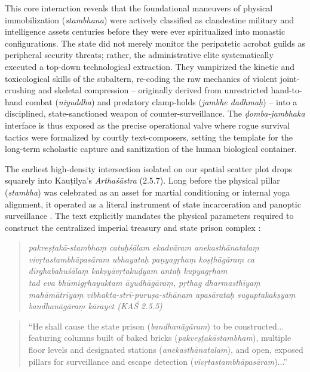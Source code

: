 \documentclass[11pt,twoside,letterpaper]{article}
\begin{document}
This core interaction reveals that the foundational maneuvers of physical immobilization (\textit{stambhana}) were actively classified as clandestine military and intelligence assets centuries before they were ever spiritualized into monastic configurations. The state did not merely monitor the peripatetic acrobat guilds as peripheral security threats; rather, the administrative elite systematically executed a top-down technological extraction. They vampirized the kinetic and toxicological skills of the subaltern, re-coding the raw mechanics of violent joint-crushing and skeletal compression – originally derived from unrestricted hand-to-hand combat (\textit{niyuddha}) and predatory clamp-holds (\textit{jambhe dadhmaḥ}) – into a disciplined, state-sanctioned weapon of counter-surveillance. The \textit{ḍomba-jambhaka} interface is thus exposed as the precise operational valve where rogue survival tactics were formalized by courtly text-composers, setting the template for the long-term scholastic capture and sanitization of the human biological container.

The earliest high-density intersection isolated on our spatial scatter plot drops squarely into Kauṭilya’s \textit{Arthaśāstra} (2.5.7). Long before the physical pillar (\textit{stambha}) was celebrated as an asset for martial conditioning or internal yoga alignment, it operated as a literal instrument of state incarceration and panoptic surveillance \citep{Kangle1969}. The text explicitly mandates the physical parameters required to construct the centralized imperial treasury and state prison complex \citep{Kangle1969}:

\begin{quote}
\noindent\textit{pakveṣṭakā-stambhaṃ catuḥśālam ekadvāram anekasthānatalaṃ vivṛtastambhāpasāram ubhayataḥ paṇyagṛhaṃ koṣṭhāgāraṃ ca dīrghabahuśālaṃ kakṣyāvṛtakuḍyam antaḥ kupyagṛham } \\
\noindent\textit{tad eva bhūmigṛhayuktam āyudhāgāraṃ, pṛthag dharmasthīyaṃ mahāmātrīyaṃ vibhakta-strī-puruṣa-sthānam apasārataḥ suguptakakṣyaṃ bandhanāgāraṃ kārayet (KAŚ 2.5.5) }
\end{quote}

\begin{quote}
``He shall cause the state prison (\textit{bandhanāgāram}) to be constructed... featuring columns built of baked bricks (\textit{pakveṣṭakāstambham}), multiple floor levels and designated stations (\textit{anekasthānatalam}), and open, exposed pillars for surveillance and escape detection (\textit{vivṛtastambhāpasāram})...''
\end{quote}
\end{document}

